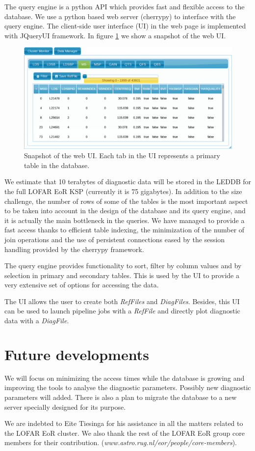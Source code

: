 \documentclass[11pt,twoside]{article}
\begin{document}
The query engine is a python API which provides fast and flexible access to the database.
We use a python based web server (cherrypy) to interface with the query engine. The client-side user interface (UI) in the web page is implemented with JQueryUI framework. In figure \ref{fig:webui} we show a snapshot of the web UI.
\begin{figure}[!ht]
  \centering
    \includegraphics[scale=0.24]{O23_f3.eps} 
  \caption{Snapshot of the web UI. Each tab in the UI represents a primary table in the database.}
  \label{fig:webui}
\end{figure}

We estimate that 10 terabytes of diagnostic data will be stored in the LEDDB for the full LOFAR EoR KSP (currently it is 75 gigabytes). In addition to the size challenge, the number of rows of some of the tables is the most important aspect to be taken into account in the design of the database and its query engine, and it is actually the main bottleneck in the queries. We have managed to provide a fast access thanks to efficient table indexing, the minimization of the number of join operations and the use of persistent connections eased by the session handling provided by the cherrypy framework. 

The query engine provides functionality to sort, filter by column values and by selection in primary and secondary tables. This is used by the UI to provide a very extensive set of options for accessing the data.

The UI allows the user to create both \textit{RefFiles} and \textit{DiagFiles}. Besides, this UI can be used to launch pipeline jobs with a \textit{RefFile} and directly plot diagnostic data with a \textit{DiagFile}.

\section{Future developments}
We will focus on minimizing the access times while the database is growing and improving the tools to analyse the diagnostic parameters. Possibly new diagnostic parameters will added. There is also a plan to migrate the database to a new server specially designed for its purpose. 

\acknowledgements We are indebted to Eite Tiesinga for his assistance in all the matters related to the LOFAR EoR cluster. We also thank the rest of the LOFAR EoR group core members for their contribution. \newline (\textit{www.astro.rug.nl/eor/people/core-members}).
\end{document}
